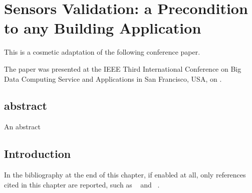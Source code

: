 
\chapter[Sensors Validation]%
{Sensors Validation: a Precondition to any Building Application}
\label{chap:publications:first-publication}

\begin{refsegment}

This  is a cosmetic adaptation of the following conference paper.


The paper was presented at the IEEE Third International Conference on Big Data Computing Service and Applications in San Francisco, USA, on .


\section*{abstract}

An abstract

\section{Introduction}

In the bibliography at the end of this chapter, if enabled at all, only references cited in this chapter are reported, such as ~\autocite{eu:32018L0844} and ~\autocite{doi:10.1145/3277868.3277875}.



\iftoggle{separatebibliography}{
    \printbibliography[
        heading=subbibliography,
        segment=\therefsegment,
    ]
}{}
\end{refsegment}
